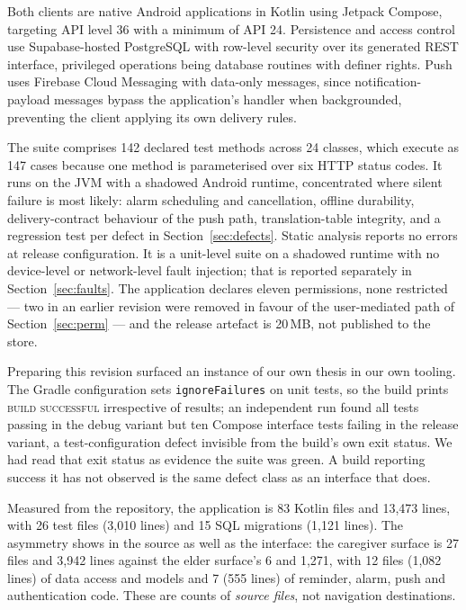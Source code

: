 \documentclass[runningheads,a4paper]{llncs}
\begin{document}
Both clients are native Android applications in Kotlin using Jetpack Compose, targeting API
level 36 with a minimum of API 24. Persistence and access control use Supabase-hosted
PostgreSQL with row-level security over its generated REST interface, privileged operations
being database routines with definer rights. Push uses Firebase Cloud Messaging with
data-only messages, since notification-payload messages bypass the application's handler
when backgrounded, preventing the client applying its own delivery rules.

The suite comprises 142 declared test methods across 24 classes, which execute as 147 cases
because one method is parameterised over six HTTP status codes. It runs on the JVM with a
shadowed Android runtime, concentrated where silent failure is most likely: alarm
scheduling and cancellation, offline durability, delivery-contract behaviour of the push
path, translation-table integrity, and a regression test per defect in
Section~\ref{sec:defects}. Static analysis reports no errors at release configuration. It
is a unit-level suite on a shadowed runtime with no device-level or network-level fault
injection; that is reported separately in Section~\ref{sec:faults}. The application declares
eleven permissions, none restricted --- two in an earlier revision were removed in favour of
the user-mediated path of Section~\ref{sec:perm} --- and the release artefact is 20\,MB,
not published to the store.

Preparing this revision surfaced an instance of our own thesis in our own tooling. The
Gradle configuration sets \texttt{ignoreFailures} on unit tests, so the build prints
\textsc{build successful} irrespective of results; an independent run found all tests
passing in the debug variant but ten Compose interface tests failing in the release
variant, a test-configuration defect invisible from the build's own exit status. We had
read that exit status as evidence the suite was green. A build reporting success it has not
observed is the same defect class as an interface that does.

Measured from the repository, the application is 83 Kotlin files and 13,473 lines, with 26
test files (3,010 lines) and 15 SQL migrations (1,121 lines). The asymmetry shows in the
source as well as the interface: the caregiver surface is 27 files and 3,942 lines against
the elder surface's 6 and 1,271, with 12 files (1,082 lines) of data access and models and
7 (555 lines) of reminder, alarm, push and authentication code. These are counts of
\emph{source files}, not navigation destinations.
\end{document}
